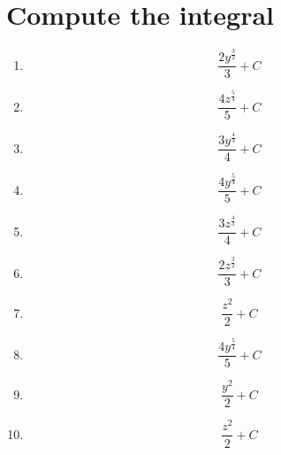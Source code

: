 \documentclass{article}
\begin{document}
        \section{Compute the integral}
        
        \begin{enumerate}
        \item$$\frac{2 y^{\frac{3}{2}}}{3} + C $$
\item$$\frac{4 z^{\frac{5}{4}}}{5} + C $$
\item$$\frac{3 y^{\frac{4}{3}}}{4} + C $$
\item$$\frac{4 y^{\frac{5}{4}}}{5} + C $$
\item$$\frac{3 z^{\frac{4}{3}}}{4} + C $$
\item$$\frac{2 z^{\frac{3}{2}}}{3} + C $$
\item$$\frac{z^{2}}{2} + C $$
\item$$\frac{4 y^{\frac{5}{4}}}{5} + C $$
\item$$\frac{y^{2}}{2} + C $$
\item$$\frac{z^{2}}{2} + C $$
        \end{enumerate}
        

    
\end{document}
